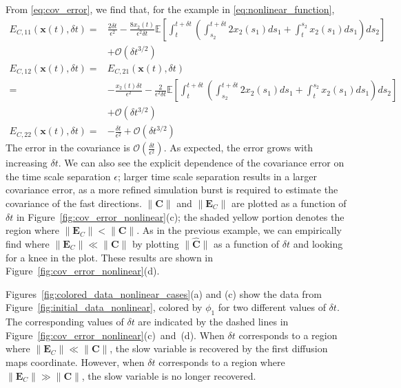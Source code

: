 From \eqref{eq:cov_error}, we find that, for the example in \eqref{eq:nonlinear_function},
%
\begin{equation}
\begin{aligned}
E_{C,11} (\mathbf{x}(t), \delta t)
=&
\frac{2 \delta t}{\epsilon^2}
- \frac{8 x_2(t)}{\epsilon^2 \delta t} \mathbb{E} \left[ \int_t^{t+\delta t} \left( \int_{s_2}^{t+\delta t} 2 x_2(s_1) ds_1
+  \int_t^{s_2} x_2(s_1) ds_1 \right) ds_2\right]  \\ &+ \mathcal{O} (\delta t^{3/2}) \\
E_{C, 12} (\mathbf{x}(t), \delta t)
= &
E_{C, 21} (\mathbf{x}(t), \delta t)\\
=&
- \frac{x_2(t) \delta t}{\epsilon^2}
- \frac{2}{\epsilon^2 \delta t} \mathbb{E} \left[ \int_t^{t+\delta t} \left( \int_{s_2}^{t + \delta t} 2 x_2(s_1) ds_1 + \int_t^{s_2} x_2(s_1) ds_1 \right) ds_2 \right] \\ &+ \mathcal{O} (\delta t^{3/2})\\
E_{C, 22} (\mathbf{x}(t), \delta t)
=&
-\frac{\delta t}{\epsilon^2} + \mathcal{O} (\delta t^{3/2})
\end{aligned}
\end{equation}
%
The error in the covariance is $\mathcal{O} \left( \frac{\delta t}{\epsilon^2} \right)$.
%
As expected, the error grows with increasing $\delta t$.
%
We can also see the explicit dependence of the covariance error on the time scale separation $\epsilon$; larger time scale separation results in a larger covariance error, as a more refined simulation burst is required to estimate the covariance of the fast directions.
%
$\|\mathbf{C} \|$ and $\| \mathbf{E}_C\|  $ are plotted as a function of $\delta t$ in Figure~\ref{fig:cov_error_nonlinear}(c); the shaded yellow portion denotes the region where $\| \mathbf{E}_C \| < \| \mathbf{C} \|$.
%
As in the previous example, we can empirically find where $\| \mathbf{E}_C \| \ll \| \mathbf{C} \|$  by plotting $\| \hat{\mathbf{C}} \|$ as a function of $\delta t $ and looking for a knee in the plot.
%
These results are shown in Figure~\ref{fig:cov_error_nonlinear}(d).

Figures~\ref{fig:colored_data_nonlinear_cases}(a) and (c) show the data from Figure~\ref{fig:initial_data_nonlinear}, colored by $\phi_1$ for two different values of $\delta t$.
%
The corresponding values of $\delta t$ are indicated by the dashed lines in Figure~\ref{fig:cov_error_nonlinear}(c)~and~(d).
%
When $\delta t$ corresponds to a region where $\|\mathbf{E}_C \| \ll \| \mathbf{C} \|$, the slow variable is recovered by the first diffusion maps coordinate.
%
However, when $\delta t$ corresponds to a region where $\|\mathbf{E}_C \| \gg \| \mathbf{C} \|$, the slow variable is no longer recovered.


